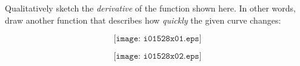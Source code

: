 

Qualitatively sketch the {\it derivative} of the function shown here.  In other words, draw another function that describes how {\it quickly} the given curve changes:

$$\texttt{[image: i01528x01.eps]}$$







$$\texttt{[image: i01528x02.eps]}$$












